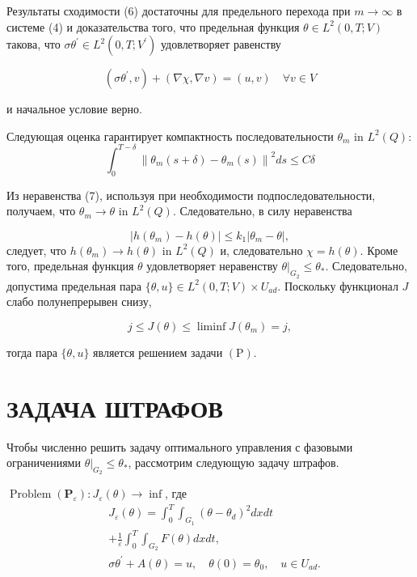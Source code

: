 Результаты сходимости (6) достаточны для предельного перехода
при $m \rightarrow \infty$ в системе (4) и доказательства того,
что предельная функция $\theta \in L^{2}(0, T ; V) $ такова,
что $\sigma \theta^{\prime} \in L^{2}\left(0, T ; V^{\prime}\right)$ удовлетворяет равенству

\[
\left(\sigma \theta^{\prime}, v\right)+(\nabla \chi, \nabla v)=(u, v) \quad \forall v \in V
\]

и начальное условие верно.

Следующая оценка гарантирует компактность последовательности $\theta_{m}$ in $L^{2}(Q)$:
\[
\int_{0}^{T-\delta}\left\|\theta_{m}(s+\delta)-\theta_{m}(s)\right\|^{2} d s \leq C \delta
\]

Из неравенства (7), используя при необходимости подпоследовательности, получаем, что
$\theta_{m} \rightarrow \theta$ in $L^{2}(Q)$.
Следовательно, в силу неравенства

\[
\left|h\left(\theta_{m}\right)-h(\theta)\right| \leq k_{1}\left|\theta_{m}-\theta\right|,
\]
следует, что $h\left(\theta_{m}\right) \rightarrow h(\theta)$ in $L^{2}(Q)$
и, следовательно $\chi=h(\theta)$.
Кроме того, предельная функция $\theta$ удовлетворяет неравенству
$\left.\theta\right|_{G_{2}} \leq \theta_{*}$.
Следовательно, допустима предельная пара $\{\theta, u\} \in L^{2}(0, T ; V) \times U_{a d}$.
Поскольку функционал $J$ слабо полунепрерывен снизу,

\[
j \leq J(\theta) \leq \liminf J\left(\theta_{m}\right)=j,
\]

тогда пара $\{\theta, u\}$ является решением задачи $(\mathrm{P})$.

\section{ЗАДАЧА ШТРАФОВ}

Чтобы численно решить задачу оптимального управления с фазовыми ограничениями
$\left.\theta\right|_{G_{2}} \leq \theta_{*}$, рассмотрим следующую задачу штрафов.

$\operatorname{Problem}\left(\mathbf{P}_{\varepsilon}\right): J_{\varepsilon}(\theta) \rightarrow \inf$,
где
\[
\begin{aligned}
& J_{\varepsilon}(\theta)=\int_{0}^{T} \int_{G_{1}}\left(\theta-\theta_{d}\right)^{2} d x d t \\
& +\frac{1}{\varepsilon} \int_{0}^{T} \int_{G_{2}} F(\theta) d x d t, \\
& \sigma \theta^{\prime}+A(\theta)=u, \quad \theta(0)=\theta_{0}, \quad u \in U_{a d} .
\end{aligned}
\]

